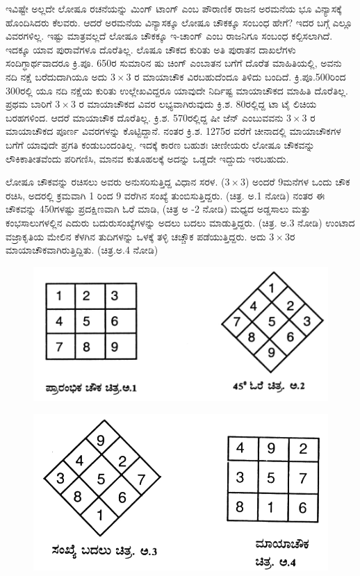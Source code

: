 ಇವಿಷ್ಟೇ ಅಲ್ಲದೇ ಲೋಷೂ ರಚನೆಯನ್ನು ಮಿಂಗ್ ಟಾಂಗ್ ಎಂಬ ಪೌರಾಣಿಕ ರಾಜನ ಅರಮನೆಯ ಭೂ ವಿನ್ಯಾಸಕ್ಕೆ ಹೊಂದಿಸಿದರು ಕೆಲವರು. ಆದರೆ ಅರಮನೆಯ ವಿನ್ಯಾಸಕ್ಕೂ ಲೋಷೂ ಚೌಕಕ್ಕೂ ಸಂಬಂಧ ಹೇಗೆ? ಇದರ ಬಗ್ಗೆ ಎಲ್ಲೂ ವಿವರಗಳಿಲ್ಲ. ಇಷ್ಟು ಮಾತ್ರವಲ್ಲದೆ ಲೋಷೂ ಚೌಕಕ್ಕೂ ಇ-ಚಾಂಗ್ ಎಂಬ ರಾಜನಿಗೂ ಸಂಬಂಧ ಕಲ್ಪಿಸಲಾಗಿದೆ. \hbox{ಇದಕ್ಕೂ} ಯಾವ ಪುರಾವೆಗಳೂ ದೊರೆತಿಲ್ಲ. ಲೊಷೂ ಚೌಕದ ಕುರಿತು ಅತಿ ಪುರಾತನ ದಾಖಲೆಗಳು ಸಂದಿಗ್ಧಾರ್ಥವಾದರೂ ಕ್ರಿ.ಪೂ. 650ರ ಸುಮಾರಿನ ಷು ಚಿಂಗ್ ಎಂಬಾತನ ಬಗೆಗೆ ದೊರೆತ ಮಾಹಿತಿಯಲ್ಲಿ, ಅವನು ನದಿ ನಕ್ಷೆ ಬರೆದುದಾಗಿಯೂ ಅದು $3 \times 3$ ರ ಮಾಯಾಚೌಕ \hbox{ವಿರಬಹುದೆಂದೂ} ತಿಳಿದು ಬಂದಿದೆ. ಕ್ರಿ.ಪೂ.500ರಿಂದ 300ರಲ್ಲಿ ಯೂ ನದಿ ನಕ್ಷೆಯ \hbox{ಕುರಿತು} ಉಲ್ಲೇಖವಿದ್ದರೂ ಯಾವುದೇ ನಿರ್ದಿಷ್ಟ ಮಾಯಾಚೌಕದ ಮಾಹಿತಿ ದೊರೆತಿಲ್ಲ. ಪ್ರಥಮ ಬಾರಿಗೆ $3 \times 3$ ರ ಮಾಯಾ\-ಚೌಕದ ವಿವರ ಲಭ್ಯವಾಗಿರುವುದು ಕ್ರಿ.ಶ. 80ರಲ್ಲಿದ್ದ ಟಾ ಟೈ ಲಿಚಿಯ ಬರಹ\-ಗಳಿಂದ. ಆದರೆ ಮಾಯಾಚೌಕ ದೊರೆತಿಲ್ಲ. ಕ್ರಿ.ಶ. 570ರಲ್ಲಿದ್ದ ಷೀ ಜೆನ್ ಎಂಬುವವನು $3 \times 3$ ರ ಮಾಯಾಚೌಕದ ಪೂರ್ಣ ವಿವರಗಳನ್ನು ಕೊಟ್ಟಿದ್ದಾನೆ. ನಂತರ ಕ್ರಿ.ಶ. 1275ರ ವರೆಗೆ ಚೀನಾದಲ್ಲಿ ಮಾಯಾಚೌಕಗಳ ಬಗೆಗೆ ಯಾವುದೇ ಪ್ರಗತಿ ಕಂಡುಬಂದಂತಿಲ್ಲ. \linebreak ಇದಕ್ಕೆ ಕಾರಣ ಬಹುಶಃ ಚೀಣೀಯರು ಲೋಷೂ ಚೌಕವನ್ನು ಲೌಕಿಕಾತೀತವೆಂದು ಪರಿಗಣಿಸಿ, \break ಮಾನವ ಕುತೂಹಲಕ್ಕೆ ಅದನ್ನು ಒಡ್ಡದೇ ಇದ್ದುದು ಇರಬಹುದು.

ಲೋಷೂ ಚೌಕವನ್ನು ರಚಿಸಲು ಅವರು ಅನುಸರಿಸುತ್ತಿದ್ದ ವಿಧಾನ ಸರಳ. ($3 \times 3$) ಅಂದರೆ 9ಮನೆಗಳ ಒಂದು ಚೌಕ ರಚಿಸಿ, ಅದರಲ್ಲಿ ಕ್ರಮವಾಗಿ 1 ರಿಂದ 9 ವರೆಗಿನ ಸಂಖ್ಯೆ ತುಂಬಿಸುತ್ತಿದ್ದರು. (ಚಿತ್ರ. ಅ.1 ನೋಡಿ) ನಂತರ ಈ ಚೌಕವನ್ನು 450ಗಳಷ್ಟು ಪ್ರದಕ್ಷಿಣವಾಗಿ ಓರೆ ಮಾಡಿ, (ಚಿತ್ರ ಅ -2 ನೋಡಿ) ಮಧ್ಯದ ಅಡ್ಡಸಾಲು ಮತ್ತು ಕಂಭಸಾಲುಗಳಲ್ಲಿನ ಎದುರು ಬದುರುಸಂಖ್ಯೆಗಳನ್ನು ಅದಲು ಬದಲು ಮಾಡುತ್ತಿದ್ದರು. (ಚಿತ್ರ. ಅ.3 ನೋಡಿ) ಉಂಟಾದ ವಜ್ರಾಕೃತಿಯ ಮೇಲಿನ ಕೆಳಗಿನ ತುದಿಗಳನ್ನು ಒಳಕ್ಕೆ ತಳ್ಳಿ ಚಚ್ಚೌಕ ಪಡೆಯುತ್ತಿದ್ದರು. ಅದು $3 \times 3$ರ ಮಾಯಾಚೌಕವಾಗಿರುತ್ತಿದ್ದಿತು. (ಚಿತ್ರ.ಅ.4 ನೋಡಿ)
\begin{figure}[H]
\includegraphics{src/figures/chap9/fig9-2.jpg}
\end{figure}
\begin{figure}[H]
\includegraphics{src/figures/chap9/fig9-3.jpg}
\end{figure}

